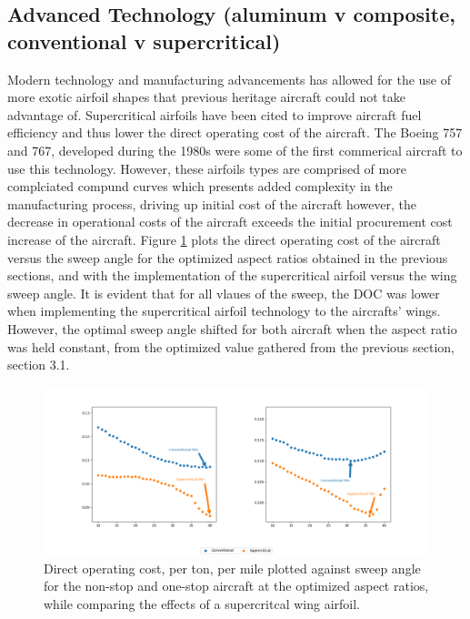 \documentclass{article}
\begin{document}
    \subsection{Advanced Technology (aluminum v composite, conventional v supercritical)}
        \begin{flushleft}
            Modern technology and manufacturing advancements has allowed for the
            use of more exotic airfoil shapes that previous heritage aircraft
            could not take advantage of. Supercritical airfoils have been cited
            to improve aircraft fuel efficiency and thus lower the direct
            operating cost of the aircraft. The Boeing 757 and 767, developed
            during the 1980s were some of the first commerical aircraft to use
            this technology. However, these airfoils types are comprised of more
            complciated compund curves which presents added complexity in the
            manufacturing process, driving up initial cost of the aircraft
            however, the decrease in operational costs of the aircraft exceeds
            the initial procurement cost increase of the aircraft. Figure
            \ref{fig:supercritical} plots the direct operating cost of the
            aircraft versus the sweep angle for the optimized aspect ratios
            obtained in the previous sections, and with the implementation of
            the supercritical airfoil versus the wing sweep angle. It is evident
            that for all vlaues of the sweep, the DOC was lower when
            implementing the supercritical airfoil technology to the aircrafts'
            wings. However, the optimal sweep angle shifted for both aircraft
            when the aspect ratio was held constant, from the optimized value
            gathered from the previous section, section 3.1.

            \begin{figure}[ht]
                \centering
                \includegraphics[scale=0.4]{CvS.PNG}
                \caption{Direct operating cost, per ton, per mile plotted against sweep angle for the non-stop and one-stop aircraft at the optimized aspect ratios, while comparing the effects of a supercritcal wing airfoil.}
                \label{fig:supercritical}
            \end{figure}


\end{flushleft}
\end{document}
